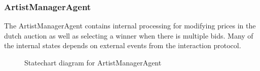 \documentclass[paper=letter, fontsize=12pt]{article}
\begin{document}
\subsubsection{ArtistManagerAgent}
The ArtistManagerAgent contains internal processing for modifying prices in the dutch auction as well as selecting a winner when there is multiple bids. Many of the internal states depends on external events from the interaction protocol.
\begin{figure}[H]
  \begin{center}
    \caption{Statechart diagram for ArtistManagerAgent}
    \label{fig:artistmanager_state}
  \end{center}
\end{figure}
\end{document}
